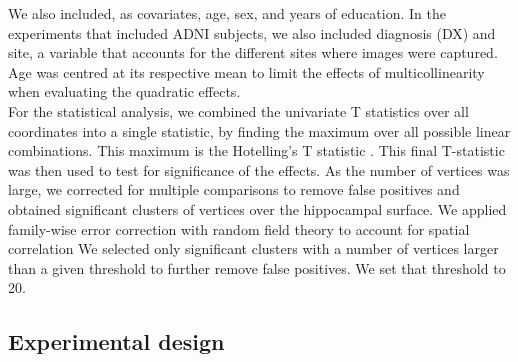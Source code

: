 \begin{table}[htbp]
\centering
{}
\caption[APOE allele pair counts.]{APOE allele pair counts for the studied cohorts. HE: heterozygotes. HO: homozygotes.}\label{table:apoeallele}
\end{table}

We also included, as covariates, age, sex, and years of education. In the experiments that included ADNI subjects, we also included diagnosis (DX) and site, a variable that accounts for the different sites where images were captured. Age was centred at its respective mean to limit the effects of multicollinearity when evaluating the quadratic effects. \\

For the statistical analysis, we combined the univariate T statistics over all coordinates into a single statistic, by finding the maximum over all possible linear combinations. This maximum is the Hotelling's T statistic \cite{Hotelling2007}. This final T-statistic was then used to test for significance of the effects. As the number of vertices was large, we corrected for multiple comparisons to remove false positives and obtained significant clusters of vertices over the hippocampal surface. We applied family-wise error correction with random field theory to account for spatial correlation \cite{Hayasaka2004} We selected only significant clusters with a number of vertices larger than a given threshold to further remove false positives. We set that threshold to 20. \\

\subsection{Experimental design}
\label{subsec:exp}

